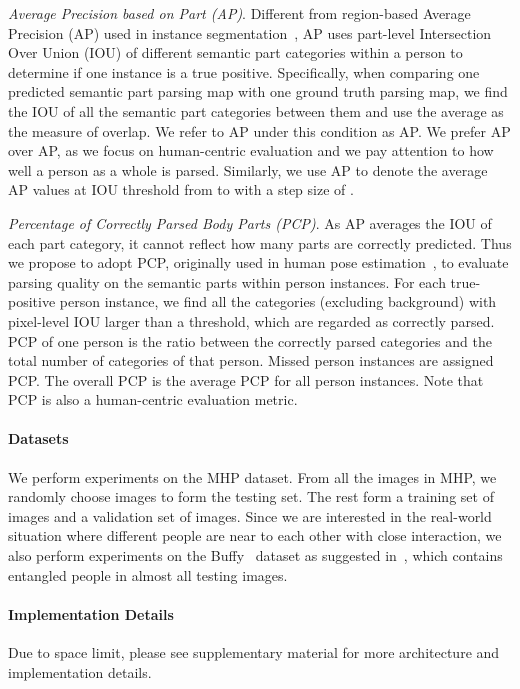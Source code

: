 \documentclass[10pt, letterpaper]{article}
\begin{document}
\emph{Average Precision based on Part (AP)}. Different from region-based Average Precision (AP) used in instance segmentation~\cite{liang2015proposal,hariharan2014simultaneous},  AP uses part-level Intersection Over Union (IOU) of different semantic part categories within a person to determine if one instance is a true positive. Specifically, when comparing one predicted semantic part parsing map with one ground truth parsing map, we find the IOU of all the semantic part categories between them and use the average as the measure of overlap. We refer to AP under this condition as AP.  We prefer AP over AP, as we focus on human-centric evaluation and we pay attention to how well a person as a whole is parsed. Similarly, we use AP to denote the average AP values at IOU threshold from  to  with a step size of . 

\emph{Percentage of Correctly Parsed Body Parts (PCP)}. As AP averages the IOU of each part category, it cannot reflect how many parts are correctly predicted. Thus we propose to adopt PCP, originally used in human pose estimation~\cite{ferrari2008progressive,chen2014detect}, to evaluate parsing quality on the semantic parts within person instances. For each true-positive person instance, we find all the categories (excluding background) with pixel-level IOU larger than a threshold, which are regarded as correctly parsed. PCP of one person is the ratio between the correctly parsed categories and the total number of categories of that person. Missed person instances are assigned  PCP. The overall PCP is the average PCP for all person instances. Note that PCP is also a human-centric evaluation metric. 

\paragraph{Datasets}
We perform experiments on the MHP dataset. From all the images in MHP,  we randomly choose  images to form the testing set. The rest form a training set of  images and a validation set of  images. Since we are interested in the real-world situation where different people are near to each other with close interaction, we also perform experiments on the Buffy~\cite{vineet2011human} dataset as suggested in~\cite{jiang2017detangling}, which contains entangled people in almost all testing images.  

\paragraph{Implementation Details}
Due to space limit, please see supplementary material for more architecture and  implementation details.
\end{document}
